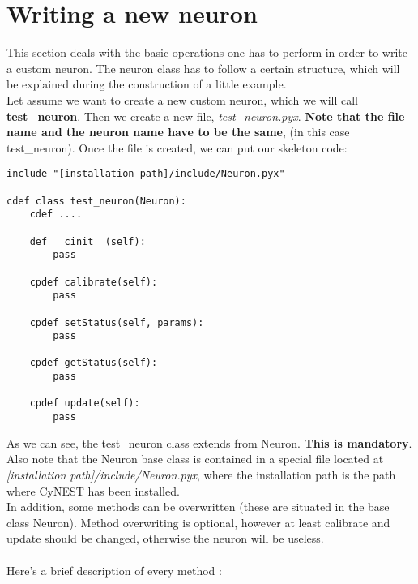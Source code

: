 \documentclass{article}
\begin{document}
\section{Writing a new neuron}
This section deals with the basic operations one has to perform in order to write a custom neuron. The neuron class has to follow a certain structure, which will be explained during the construction of a little example. \\
Let assume we want to create a new custom neuron, which we will call \textbf{test\_neuron}. Then we create a new file, \emph{test\_neuron.pyx}. \textbf{Note that the file name and the neuron name have to be the same}, (in this case test\_neuron). Once the file is created, we can put our skeleton code:
\begin{verbatim}
include "[installation path]/include/Neuron.pyx"

cdef class test_neuron(Neuron):
    cdef ....
    
    def __cinit__(self):
        pass

    cpdef calibrate(self):
        pass

    cpdef setStatus(self, params):
        pass

    cpdef getStatus(self):
        pass

    cpdef update(self):
        pass
\end{verbatim}
As we can see, the test\_neuron class extends from Neuron. \textbf{This is mandatory}. Also note that the Neuron base class is contained in a special file located at \emph{[installation path]/include/Neuron.pyx}, where the installation path is the path where CyNEST has been installed.\\
In addition, some methods can be overwritten (these are situated in the base class Neuron). Method overwriting is optional, however at least calibrate and update should be changed, otherwise the neuron will be useless.\\ \\
Here's a brief description of every method :
\end{document}
